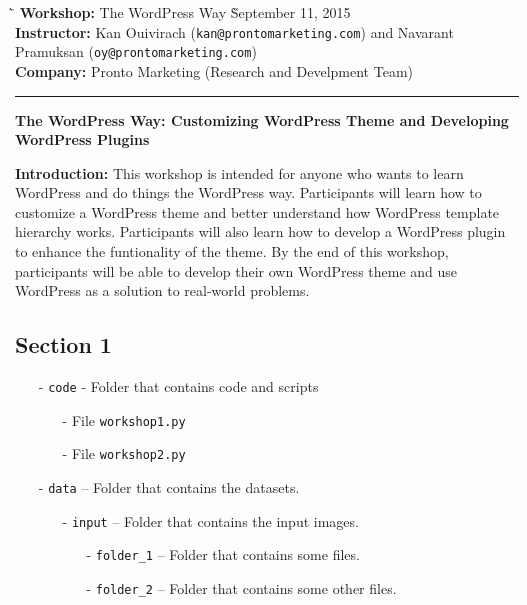 \documentclass{article}
\begin{document}
\begin{tabbing}
    \`\=\kill
    \textbf{Workshop:} The WordPress Way
    \` September 11, 2015 \\
    \textbf{Instructor:} Kan Ouivirach ({\tt \small kan@prontomarketing.com})
        and Navarant Pramuksan ({\tt \small oy@prontomarketing.com}) \\
    \textbf{Company:} Pronto Marketing (Research and Develpment Team)
\end{tabbing}

\hrule

\vspace{.25in}

\begin{center}
    \textbf{\Large The WordPress Way: Customizing WordPress Theme and
        Developing WordPress Plugins}
\end{center}

\vspace{.15in}

\noindent \textbf{Introduction:} This workshop is intended for anyone who wants
    to learn WordPress and do things the WordPress way. Participants will
    learn how to customize a WordPress theme and better understand how
    WordPress template hierarchy works. Participants will also learn
    how to develop a WordPress plugin to enhance the funtionality of the theme.
    By the end of this workshop, participants will be able to develop their own
    WordPress theme and use WordPress as a solution to real-world problems.


\subsection*{Section 1}

\begin{itemize}
    \item[-] {\tt code} - Folder that contains code and scripts
    \begin{itemize}
        \item[-] File {\tt workshop1.py}
        \item[-] File {\tt workshop2.py}
    \end{itemize}
    \item[-] {\tt data} -- Folder that contains the datasets.
    \begin{itemize}
        \item[-] {\tt input} -- Folder that contains the input images.
        \begin{itemize}
            \item[-] {\tt folder\_1} -- Folder that contains some files.
            \item[-] {\tt folder\_2} -- Folder that contains some other files.
        \end{itemize}
    \end{itemize}
\end{itemize}
\end{document}
